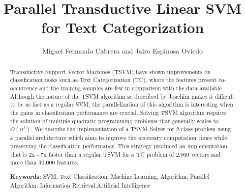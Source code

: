 



%


\title{Parallel Transductive Linear SVM for Text Categorization}

\author{Miguel Fernando Cabrera and Jairo Espinosa Oviedo}



\maketitle

\begin{abstract}
Transductive Support Vector Machines (TSVM) have shown improvements
on classification tasks such as Text Categorization (TC), where the
features present co-occurrence and the training samples are few in
comparison with the data available. Although the nature of the TSVM
algorithm as described by Joachim makes it difficult to be as fast
as a regular SVM, the parallelization of this algorithm is interesting
when the gains in classification performance are crucial. Solving
TSVM algorithm requires the solution of multiple quadratic programming
problems that generally scales to $O(n^{3})$. We describe the implementation
of a TSVM Solver for 2-class problem using a parallel architecture
which aims to improve the necessary computation times while preserving
the classification performance. This strategy produced an implementation 
that is 2x - 7x faster than a regular TSVM for a TC problem of 2,000 vectors 
and more than 30,000 features.

{\bf Keywords:} SVM, Text Classification, Machine Learning, Algorithm,
Parallel Algorithm, Information Retrieval,Artificial Intelligence

\end{abstract}

